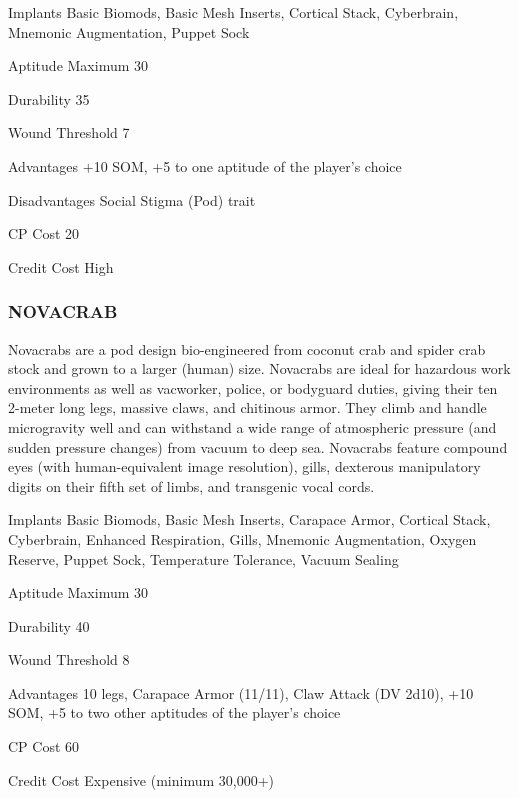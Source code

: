 \begin{description*}
\item[Implants] Basic Biomods, Basic Mesh Inserts, Cortical Stack, Cyberbrain,
  Mnemonic Augmentation, Puppet Sock
\item[Aptitude Maximum] 30 
\item[Durability] 35 
\item[Wound Threshold] 7 
\item[Advantages] +10 SOM, +5 to one aptitude of the player’s choice 
\item[Disadvantages] Social Stigma (Pod) trait 
\item[CP Cost] 20 
\item[Credit Cost] High 
\end{description*}

\subsubsection{NOVACRAB}
Novacrabs are a pod design bio-engineered from coconut crab and spider crab
stock and grown to a larger (human) size. Novacrabs are ideal for hazardous
work environments as well as vacworker, police, or bodyguard duties, giving
their ten 2-meter long legs, massive claws, and chitinous armor. They climb and
handle microgravity well and can withstand a wide range of atmospheric pressure
(and sudden pressure changes) from vacuum to deep sea. Novacrabs feature
compound eyes (with human-equivalent image resolution), gills, dexterous
manipulatory digits on their fifth set of limbs, and transgenic vocal cords.

\begin{description*}
\item[Implants] Basic Biomods, Basic Mesh Inserts, Carapace Armor, Cortical
  Stack, Cyberbrain, Enhanced Respiration, Gills, Mnemonic Augmentation, Oxygen
  Reserve, Puppet Sock, Temperature Tolerance, Vacuum Sealing
\item[Aptitude Maximum] 30 
\item[Durability] 40 
\item[Wound Threshold] 8 
\item[Advantages] 10 legs, Carapace Armor (11/11), Claw Attack (DV 2d10), +10
  SOM, +5 to two other aptitudes of the player’s choice
\item[CP Cost] 60 
\item[Credit Cost] Expensive (minimum 30,000+) 
\end{description*}

